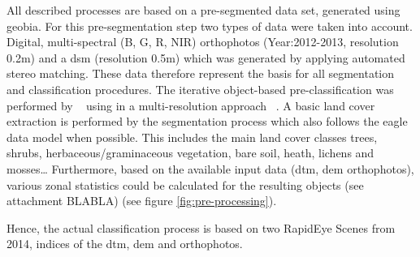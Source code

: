 \documentclass[authoryear,review,12pt,number]{elsarticle}
\begin{document}
All described processes are based on a pre-segmented data set, generated using
\gls{geobia}. For this pre-segmentation step two types of data were taken into
account. Digital, multi-spectral (B, G, R, NIR) orthophotos (Year:2012-2013,
resolution 0.2m) and a \gls{dsm} (resolution 0.5m) which was generated by applying
automated stereo matching. These data therefore represent the basis for all
segmentation and classification procedures. 
The iterative object-based pre-classification was performed by
~\cite{Tintrup2015} using in a multi-resolution
approach ~\citep{baatz2001ecognition}. A basic land cover extraction is performed by the
segmentation process which also follows the \gls{eagle} data model when
possible. This includes the main land cover classes trees, shrubs,
herbaceous/graminaceous vegetation, bare soil, heath, lichens and
mosses\ldots%
Furthermore, based on the available input data (\gls{dtm}, \gls{dem}
orthophotos), various zonal statistics could be calculated for the resulting
objects (see attachment BLABLA) (see figure \ref{fig:pre-processing}).




Hence, the actual classification
process is based on two RapidEye Scenes from 2014,
indices of the \gls{dtm}, \gls{dem} and orthophotos.
\end{document}

